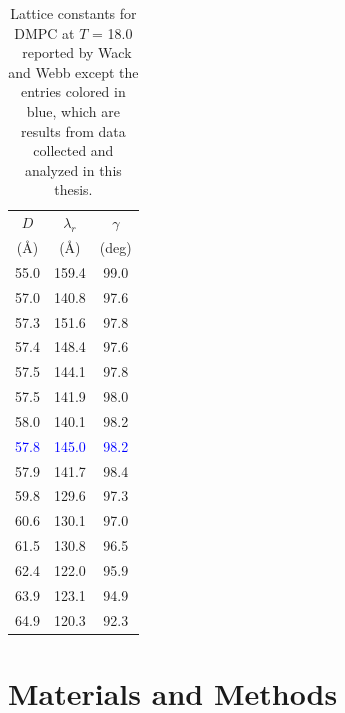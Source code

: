\begin{table}[htbp]
\centering
  \begin{tabular}{ccc}
    \hline
    $D$ & $\lambda_r$ & $\gamma$ \\
    (\AA) & (\AA) & (deg) \\
    \hline
    55.0 & 159.4 & 99.0 \\
    57.0 & 140.8 & 97.6 \\
    57.3 & 151.6 & 97.8 \\
    57.4 & 148.4 & 97.6 \\
    57.5	 & 144.1 & 97.8 \\
    57.5 & 141.9 & 98.0 \\
    58.0 & 140.1 & 98.2 \\
    \textcolor{blue}{57.8} & \textcolor{blue}{145.0} & \textcolor{blue}{98.2} \\
    57.9 & 141.7 & 98.4 \\
    59.8 & 129.6 & 97.3 \\
    60.6 & 130.1 & 97.0 \\
    61.5 & 130.8 & 96.5 \\
    62.4 & 122.0 & 95.9 \\
    63.9 & 123.1 & 94.9 \\
    64.9 & 120.3 & 92.3 \\    
    \hline 
  \end{tabular}
  \caption{Lattice constants for DMPC at $T$ = 18.0 \textcelsius\
  reported by Wack and Webb \cite{ref:Wack89} except the entries colored in blue, 
  which are results from data collected and analyzed in this thesis.} 
  \label{tab:wack_lattice}
\end{table}

\newpage
\section{Materials and Methods}\label{sec:ripple_MMs}
